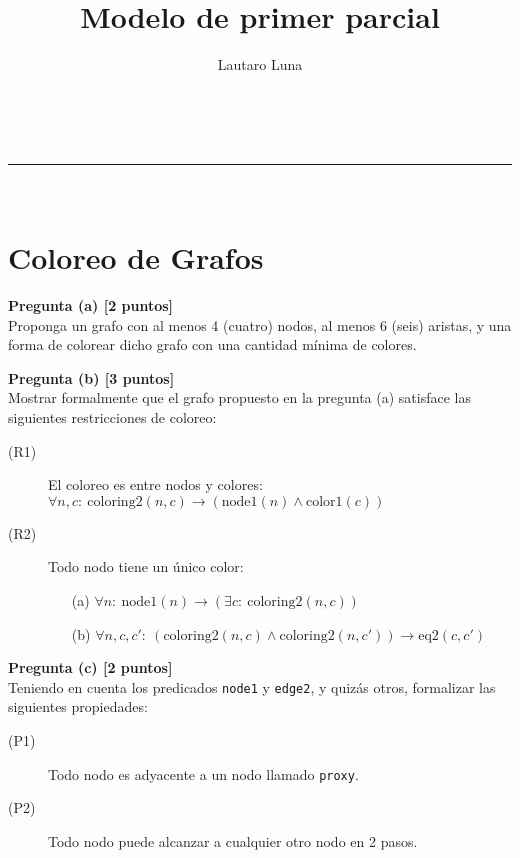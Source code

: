 \documentclass[a4paper,11pt]{article}
\makeatletter
\newcommand{\linia}{\rule{\linewidth}{0.5pt}}
\renewcommand{\maketitle}{
\begin{center}
\vspace{2ex}
{\Large \textsc{\@title}}
\vspace{1ex}
\\
\linia\\
\@author \hfill \@date
\vspace{4ex}
\end{center}
}
\makeatother
\begin{document}
\title{Modelo de primer parcial}

\author{Lautaro Luna}

\date{}

\maketitle

\vspace*{-1cm}

\section*{Coloreo de Grafos}



\textbf{Pregunta (a) [2 puntos]} \\
Proponga un grafo con al menos 4 (cuatro) nodos, al menos 6 (seis) aristas, y una forma de colorear dicho grafo con una cantidad mínima de colores.

\textbf{Pregunta (b) [3 puntos]} \\
Mostrar formalmente que el grafo propuesto en la pregunta (a) satisface las siguientes restricciones de coloreo:

\begin{description}
  \item[(R1)] El coloreo es entre nodos y colores: \\
  \( \forall n, c:\ \text{coloring2}(n, c) \rightarrow (\text{node1}(n) \land \text{color1}(c)) \)

  \item[(R2)] Todo nodo tiene un único color:
  \begin{enumerate}
    \item[(a)] \( \forall n:\ \text{node1}(n) \rightarrow (\exists c:\ \text{coloring2}(n, c)) \)
    \item[(b)] \( \forall n, c, c':\ (\text{coloring2}(n, c) \land \text{coloring2}(n, c')) \rightarrow \text{eq2}(c, c') \)
  \end{enumerate}
\end{description}

\textbf{Pregunta (c) [2 puntos]} \\
Teniendo en cuenta los predicados \texttt{node1} y \texttt{edge2}, y quizás otros, formalizar las siguientes propiedades:

\begin{description}
  \item[(P1)] Todo nodo es adyacente a un nodo llamado \texttt{proxy}.
  \item[(P2)] Todo nodo puede alcanzar a cualquier otro nodo en 2 pasos.
\end{description}
\end{document}
